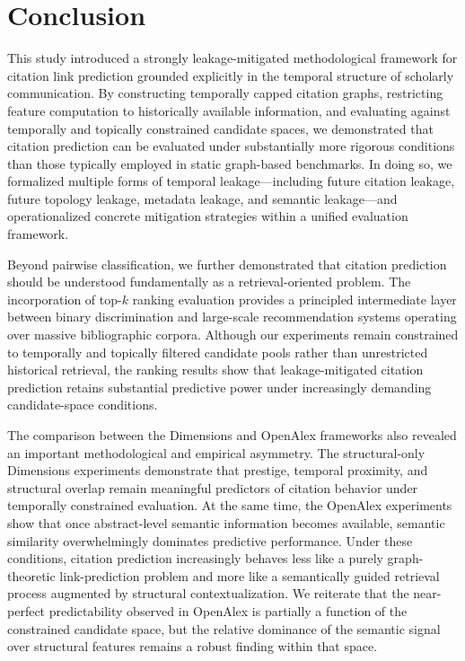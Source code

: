\documentclass[11pt,a4paper]{article}
\begin{document}
\section{Conclusion}
\label{sec:conclusion}

This study introduced a strongly leakage-mitigated methodological framework for citation link prediction grounded explicitly in the temporal structure of scholarly communication. By constructing temporally capped citation graphs, restricting feature computation to historically available information, and evaluating against temporally and topically constrained candidate spaces, we demonstrated that citation prediction can be evaluated under substantially more rigorous conditions than those typically employed in static graph-based benchmarks. In doing so, we formalized multiple forms of temporal leakage---including future citation leakage, future topology leakage, metadata leakage, and semantic leakage---and operationalized concrete mitigation strategies within a unified evaluation framework.

Beyond pairwise classification, we further demonstrated that citation prediction should be understood fundamentally as a retrieval-oriented problem. The incorporation of top-\(k\) ranking evaluation provides a principled intermediate layer between binary discrimination and large-scale recommendation systems operating over massive bibliographic corpora. Although our experiments remain constrained to temporally and topically filtered candidate pools rather than unrestricted historical retrieval, the ranking results show that leakage-mitigated citation prediction retains substantial predictive power under increasingly demanding candidate-space conditions.

The comparison between the Dimensions and OpenAlex frameworks also revealed an important methodological and empirical asymmetry. The structural-only Dimensions experiments demonstrate that prestige, temporal proximity, and structural overlap remain meaningful predictors of citation behavior under temporally constrained evaluation. At the same time, the OpenAlex experiments show that once abstract-level semantic information becomes available, semantic similarity overwhelmingly dominates predictive performance. Under these conditions, citation prediction increasingly behaves less like a purely graph-theoretic link-prediction problem and more like a semantically guided retrieval process augmented by structural contextualization. We reiterate that the near-perfect predictability observed in OpenAlex is partially a function of the constrained candidate space, but the relative dominance of the semantic signal over structural features remains a robust finding within that space.
\end{document}
